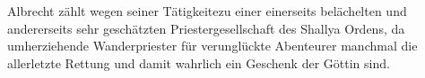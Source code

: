 
Albrecht zählt wegen seiner Tätigkeitezu einer einerseits belächelten und andererseits sehr geschätzten Priestergesellschaft des Shallya Ordens, da umherziehende Wanderpriester für verunglückte Abenteurer manchmal die allerletzte Rettung und damit wahrlich ein Geschenk der Göttin sind.